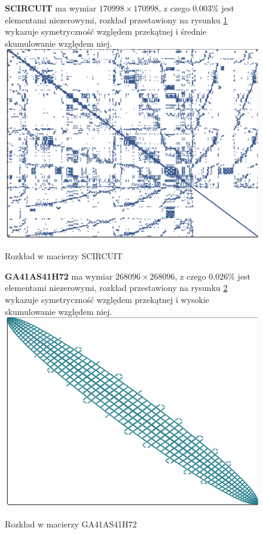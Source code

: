 \begin{figure}[!htb]
    \textbf{SCIRCUIT} ma wymiar $170998 \times 170998$, z czego $0.003\%$ jest elementami niezerowymi, rozkład przestawiony na rysunku \ref{scircuit_plot} wykazuje symetryczność względem przekątnej i średnie skumulowanie względem niej.
\endminipage\hfill
{}
  \includegraphics[width=\linewidth]{matrix_plots/scircuit.png}
  \caption{Rozkład w macierzy SCIRCUIT}\label{scircuit_plot}
\endminipage\hfill
\end{figure}

\pagebreak

\begin{figure}[!htb]
    \textbf{GA41AS41H72} ma wymiar $268096 \times 268096$, z czego $0.026\%$ jest elementami niezerowymi, rozkład przestawiony na rysunku \ref{ga41as41h72_plot} wykazuje symetryczność względem przekątnej i wysokie skumulowanie względem niej.
\endminipage\hfill
{}
  \includegraphics[width=\linewidth]{matrix_plots/Ga41As41H72.png}
  \caption{Rozkład w macierzy GA41AS41H72}\label{ga41as41h72_plot}
\endminipage\hfill
\end{figure}

